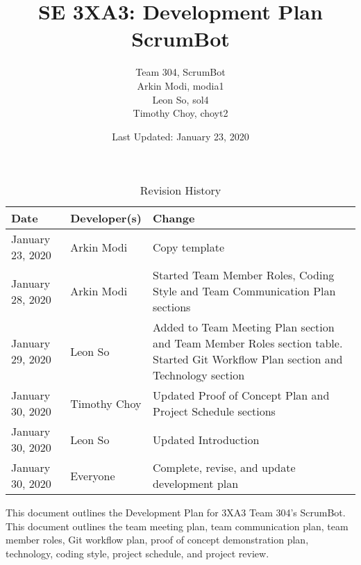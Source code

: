 \documentclass{article}
\title{SE 3XA3: Development Plan\\ScrumBot}
\author{
    Team 304, ScrumBot
        \\ Arkin Modi, modia1
        \\ Leon So, sol4
        \\ Timothy Choy, choyt2
}
\date{Last Updated: January 23, 2020}
\begin{document}
\begin{table}[hp]
    \caption{Revision History} \label{TblRevisionHistory}
    \begin{tabularx}{\textwidth}{llX}
        \toprule
            \textbf{Date} & \textbf{Developer(s)} & \textbf{Change}\\
        \midrule
            January 23, 2020 & Arkin Modi & Copy template\\
            January 28, 2020 & Arkin Modi & Started Team Member Roles, Coding Style and Team Communication Plan sections\\
            January 29, 2020 & Leon So & Added to Team Meeting Plan section and Team Member Roles section table. Started Git Workflow Plan section and Technology section\\
            January 30, 2020 & Timothy Choy & Updated Proof of Concept Plan and Project Schedule sections\\
            January 30, 2020 & Leon So & Updated Introduction\\
            January 30, 2020 & Everyone & Complete, revise, and update development plan\\
        \bottomrule
    \end{tabularx}
\end{table}

\newpage

\maketitle

\noindent This document outlines the Development Plan for 3XA3 Team 304's ScrumBot. This document outlines the team meeting plan, team communication plan, team member roles, Git workflow plan, proof of concept demonstration plan, technology, coding style, project schedule, and project review.
\end{document}
